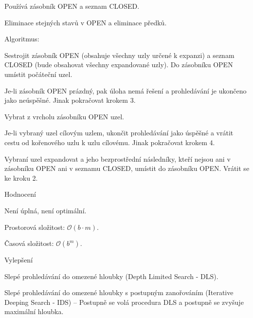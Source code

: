 \begin{compactitem}
    \item Používá zásobník OPEN a seznam CLOSED. \begin{compactitem}
        \item Eliminace stejných stavů v OPEN a eliminace předků.
    \end{compactitem}

    \item Algoritmus: \begin{compactenum}
        \item Sestrojit zásobník OPEN (obsahuje všechny uzly určené k expanzi) a seznam CLOSED (bude obsahovat všechny expandované uzly). Do zásobníku OPEN umístit počáteční uzel.

        \item Je-li zásobník OPEN prázdný, pak úloha nemá řešení a prohledávání je ukončeno jako neúspěšné. Jinak pokračovat krokem 3.

        \item Vybrat z vrcholu zásobníku OPEN uzel.

        \item Je-li vybraný uzel cílovým uzlem, ukončit prohledávání jako úspěšné a vrátit cestu od kořenového uzlu k uzlu cílovému. Jinak pokračovat krokem 4.

        \item Vybraní uzel expandovat a jeho bezprostřední následníky, kteří nejsou ani v zásobníku OPEN ani v seznamu CLOSED, umístit do zásobníku OPEN. Vrátit se ke kroku 2.
    \end{compactenum}

    \item Hodnocení \begin{compactitem}
        \item Není úplná, není optimální.
        \item Prostorová složitost: $\mathcal{O}(b \cdot m)$.
        \item Časová složitost: $\mathcal{O}(b^m)$.
    \end{compactitem}

    \item Vylepšení \begin{compactitem}
        \item Slepé prohledávání do omezené hloubky (Depth Limited Search - DLS).
        \item Slepé prohledávání do omezené hloubky s postupným zanořováním (Iterative Deeping Search - IDS) -- Postupně se volá procedura DLS a postupně se zvyšuje maximální hloubka.
    \end{compactitem}
\end{compactitem}

